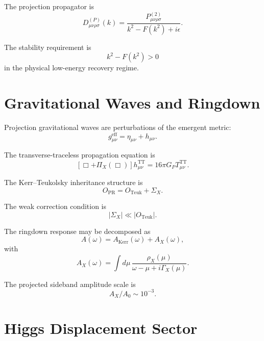 \documentclass[11pt]{article}
\newcommand{\PR}{\mathrm{PR}}
\newcommand{\eff}{\mathrm{eff}}
\newcommand{\Kerr}{\mathrm{Kerr}}
\newcommand{\TT}{\mathrm{TT}}
\newcommand{\Teuk}{\mathrm{Teuk}}
\begin{document}
The projection propagator is
\begin{equation}
\boxed{
D_{\mu\nu\rho\sigma}^{(P)}(k)
=
\frac{
P_{\mu\nu\rho\sigma}^{(2)}
}{
k^2-F(k^2)+i\epsilon
}.
}
\end{equation}

The stability requirement is
\begin{equation}
k^2-F(k^2)>0
\end{equation}
in the physical low-energy recovery regime.


\section{Gravitational Waves and Ringdown}

Projection gravitational waves are perturbations of the emergent metric:
\begin{equation}
g_{\mu\nu}^{\eff}
=
\eta_{\mu\nu}
+
h_{\mu\nu}.
\end{equation}

The transverse-traceless propagation equation is
\begin{equation}
\boxed{
\left[
\Box+\Pi_X(\Box)
\right]
h_{\mu\nu}^{\TT}
=
16\pi G_PT_{\mu\nu}^{\TT}.
}
\end{equation}

The Kerr--Teukolsky inheritance structure is
\begin{equation}
\boxed{
O_{\PR}
=
O_{\Teuk}
+
\Sigma_X.
}
\end{equation}

The weak correction condition is
\begin{equation}
|\Sigma_X|\ll|O_{\Teuk}|.
\end{equation}

The ringdown response may be decomposed as
\begin{equation}
A(\omega)
=
A_{\Kerr}(\omega)+A_X(\omega),
\end{equation}
with
\begin{equation}
A_X(\omega)
=
\int d\mu\,
\frac{\rho_X(\mu)}
{\omega-\mu+i\Gamma_X(\mu)}.
\end{equation}

The projected sideband amplitude scale is
\begin{equation}
\boxed{
A_X/A_0\sim10^{-3}.
}
\end{equation}


\section{Higgs Displacement Sector}
\end{document}
